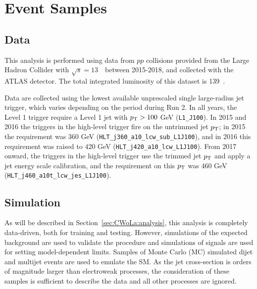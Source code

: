 \section{Event Samples}
\label{sec:CWoLa:eventsamples}


\subsection{Data}
\label{sec:CWoLa:data}

This analysis is performed using data from $pp$ collisions provided from the Large Hadron Collider with $\sqrt{s} = 13$~\TeV~between 2015-2018, and collected with the ATLAS detector. The total integrated luminosity of this dataset is 139~\ifb.

Data are collected using the lowest available unprescaled single large-radius jet trigger, which varies depending on the period during Run 2.
In all years, the Level 1 trigger require a Level 1 jet with $p_{\text{T}}>100$ GeV (\texttt{L1\_J100}).
In 2015 and 2016 the triggers in the high-level trigger fire on the untrimmed jet $p_{\text{T}}$; in 2015 the requirement was $360$ GeV (\texttt{HLT\_j360\_a10\_lcw\_sub\_L1J100}), and in 2016 this requirement was raised to $420$ GeV (\texttt{HLT\_j420\_a10\_lcw\_L1J100}).
From 2017 onward, the triggers in the high-level trigger use the trimmed jet $p_{\text{T}}$ and apply a jet energy scale calibration, and the requirement on this $p_{\text{T}}$ was $460$ GeV (\texttt{HLT\_j460\_a10t\_lcw\_jes\_L1J100}).

\subsection{Simulation}

As will be described in Section~\ref{sec:CWoLa:analysis}, this analysis is completely data-driven, both for training and testing.
However, simulations of the expected background are used to validate the procedure and simulations of signals are used for setting model-dependent limits.
Samples of Monte Carlo (MC) simulated dijet and multijet events are used to emulate the SM.
As the jet cross-section is orders of magnitude larger than electroweak processes, the consideration of these samples is sufficient to describe the data and all other processes are ignored.  

